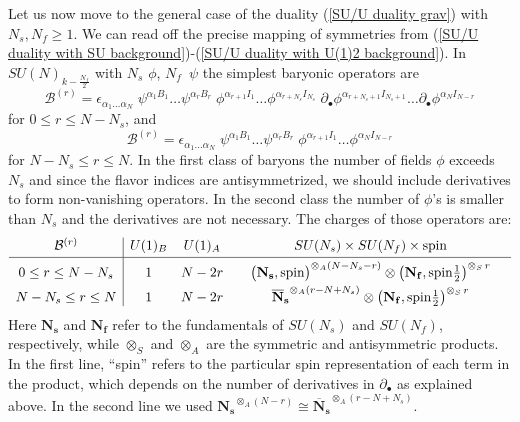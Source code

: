 \documentclass[a4paper, 12pt]{article}
\newcommand{\rep}[1]{\ensuremath{\mathbf{#1}}}
\numberwithin{equation}{section}
\newcommand{\be}{\begin{equation}} \newcommand{\ee}{\end{equation}}
\newcommand{\cB}{\mathcal{B}}
\begin{document}
Let us now move to the general case of the duality (\ref{SU/U duality grav}) with $N_s, N_f\geq1$. We can read off the precise mapping of symmetries from (\ref{SU/U duality with SU background})-(\ref{SU/U duality with U(1)2 background}). In $SU(N)_{k-\frac{N_f}2}$ with $N_s$ $\phi$, \mbox{$N_f$ $\psi$} the simplest baryonic operators are
\be
\label{baryons I}
\cB^{(r)} = \epsilon_{\alpha_1 \ldots \alpha_N} \; \psi^{\alpha_1B_1} \ldots \psi^{\alpha_r B_r} \; \phi^{\alpha_{r+1} I_1} \ldots \phi^{\alpha_{r+N_s} I_{N_s}} \; \partial_\bullet \phi^{\alpha_{r+N_s+1} I_{N_s+1}} \ldots \partial_\bullet \phi^{\alpha_N I_{N-r}}
\ee
for $0 \leq r \leq N-N_s$, and
\be
\label{baryons II}
\cB^{(r)} = \epsilon_{\alpha_1 \ldots \alpha_N} \; \psi^{\alpha_1B_1} \ldots \psi^{\alpha_r B_r} \; \phi^{\alpha_{r+1} I_1} \ldots \phi^{\alpha_N I_{N-r}}
\ee
for $N-N_s \leq r \leq N$. In the first class of baryons the number of fields $\phi$ exceeds $N_s$ and since the flavor indices are antisymmetrized, we should include derivatives to form non-vanishing operators. In the second class the number of $\phi$'s is smaller than $N_s$ and the derivatives are not necessary. The charges of those operators are:
\be
\label{quantum numbers baryons/monopoles}
\begin{array}{c|ccc}
\cB^{(r)} & U(1)_B & U(1)_A & SU(N_s) \times SU(N_f) \times \text{spin} \\[.2em]
\hline \rule{0pt}{1.4em}
0 \leq r \leq N-N_s & 1 & N-2r & \quad \big(\rep{N_s}, \text{spin}\big)^{\otimes_A(N-N_s-r)} \otimes \big(\rep{N_f}, \text{spin}\frac12 \big)^{\otimes_S \, r} \quad \\[.3em]
N-N_s \leq r \leq N & 1 & N-2r & \rep{\overline N_s}^{\otimes_A(r-N+N_s)} \otimes \big( \rep{N_f}, \text{spin}\frac12 \big)^{\otimes_S \, r}
\end{array}
\ee
Here $\rep{N_s}$ and $\rep{N_f}$ refer to the fundamentals of $SU(N_s)$ and $SU(N_f)$, respectively, while $\otimes_S$ and $\otimes_A$ are the symmetric and antisymmetric products. In the first line, ``spin'' refers to the particular spin representation of each term in the product, which depends on the number of derivatives in $\partial_\bullet$ as explained above. In the second line we used $\rep{N_s}^{\otimes_A(N-r)} \cong \rep{\overline N_s}^{\otimes_A(r-N+N_s)}$.
\end{document}
